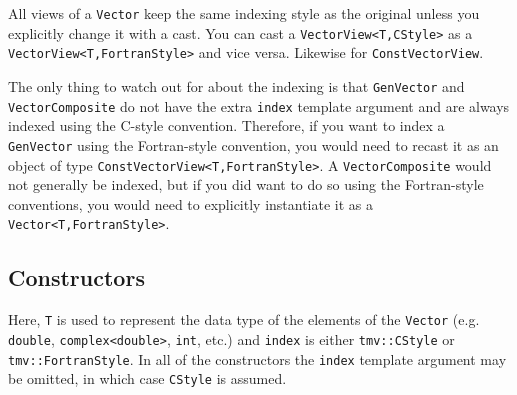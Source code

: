 \documentclass[twoside,letterpaper,11pt]{article}
\renewcommand{\tt}[1]{{\texttt {#1}}}
\begin{document}
All views of a \tt{Vector} keep the same indexing style as the original unless you
explicitly change it with a cast.  You can cast a \tt{VectorView<T,CStyle>} as
a \tt{VectorView<T,FortranStyle>} and vice versa.  Likewise for
\tt{ConstVectorView}.  

The only thing to watch out for about the indexing is that \tt{GenVector}
and \tt{VectorComposite} do not have the extra \tt{index} 
template argument and are always
indexed using the C-style convention.  Therefore, 
if you want to index a \tt{GenVector}
using the Fortran-style convention, you would need to recast it
as an object of type
\tt{ConstVectorView<T,FortranStyle>}.  A \tt{VectorComposite} would 
not generally be indexed, but if you did want to do so using the 
Fortran-style conventions, you would need to explicitly instantiate it
as a \tt{Vector<T,FortranStyle>}.

\subsection{Constructors}

Here, \tt{T} is used to represent the data type of the elements of the \tt{Vector}
(e.g. \tt{double}, \tt{complex<double>}, \tt{int}, etc.) and \tt{index} is either
\tt{tmv::CStyle} or \tt{tmv::FortranStyle}.  In all of the constructors the
\tt{index} template argument may be omitted, in which case \tt{CStyle} is assumed.
\end{document}
